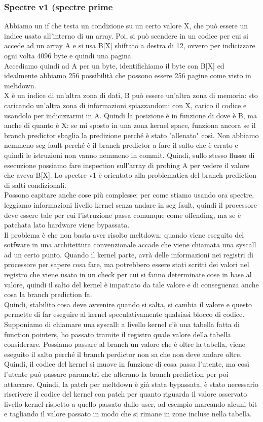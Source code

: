\documentclass[14pt, oneside]{book}
\begin{document}
\subsubsection{Spectre v1 (spectre prime}
Abbiamo un if che testa un condizione su un certo valore X, che può essere un indice usato all'interno di un array. Poi, si può scendere in un codice per cui si accede ad un array A e si usa B[X] shiftato a destra di 12, ovvero per indicizzare ogni volta 4096 byte e quindi una pagina.\\ Accediamo quindi ad A per un byte, identifichiamo il byte con B[X] ed idealmente abbiamo 256 possibilità che possono essere 256 pagine come visto in meltdown.\\ X è un indice di un'altra zona di dati, B può essere un'altra zona di memoria: sto caricando un'altra zona di informazioni spiazzandomi con X, carico il codice e usandolo per indicizzarmi in A. Quindi la posizione è in funzione di dove è B, ma anche di quanto è X: se mi sposto in una zona kernel space, funziona ancora se il branch predictor sbaglia la predizione perché è stato "allenato" così. Non abbiamo nemmeno seg fault perché è il branch predictor a fare il salto che è errato e quindi le istruzioni non vanno nemmeno in commit. Quindi, sullo stesso flusso di esecuzione possiamo fare inspection sull'array di probing A per vedere il valore che aveva B[X]. Lo spectre v1 è orientato alla problematica del branch prediction di salti condizionali.\\ Possono capitare anche cose più complesse: per come stiamo usando ora spectre, leggiamo informazioni livello kernel senza andare in seg fault, quindi il processore deve essere tale per cui l'istruzione passa comunque come offending, ma se è patchata lato hardware viene bypassata.\\ Il problema è che non basta aver risolto meltdown: quando viene eseguito del sotfware in una architettura convenzionale accade che viene chiamata una syscall ad un certo punto. Quando il  kernel parte, avrà delle informazioni nei registri di processore per sapere cosa fare, ma potrebbero essere stati scritti dei valori nel registro che viene usato in un check per cui si fanno determinate cose in base al valore, quindi il salto del kernel è impattato da tale valore e di conseguenza anche cosa la branch prediction fa.\\ Quindi, stabilito cosa deve avvenire quando si salta, si cambia il valore e questo permette di far eseguire al kernel speculativamente qualsiasi blocco di codice. Supponiamo di chiamare una syscall: a livello kernel c'è una tabella fatta di function pointers, ho passato tramite il registro quale valore della tabella considerare. Possiamo passare al branch un valore che è oltre la tabella, viene eseguito il salto perché il branch perdictor non sa che non deve andare oltre. Quindi, il codice del kernel si muove in funzione di cosa passa l'utente, ma così l'utente può passare parametri che alterano la branch prediction per poi attaccare. Quindi, la patch per meltdown è già stata bypassata, è stato necessario riscrivere il codice del kernel con patch per quanto riguarda il valore osservato livello kernel rispetto a quello passato dallo user, ad esempio marcando alcuni bit e tagliando il valore passato in modo che si rimane in zone incluse nella tabella.
\end{document}
